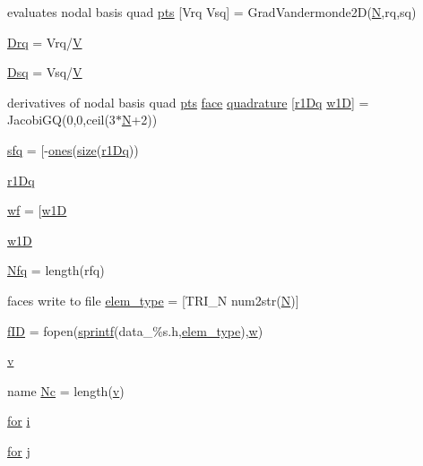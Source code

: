 \begin{DoxyCompactItemize}
evaluates nodal basis quad \hyperlink{a01014_a7d2fb616b76863109aa80a7ffdfad72b}{pts} \mbox{[}Vrq Vsq\mbox{]} = Grad\+Vandermonde2D(\hyperlink{a00473_a5b9c4563028063ee53b517cce9aa701b}{N},rq,sq)
\item 
\hyperlink{a01014_a0860e58b8f4010af9aa55717745c4b9d}{Drq} = Vrq/\hyperlink{a00575_af658e24e5ad7935911c432c5c02d895c}{V}
\item 
\hyperlink{a01014_a90f04ab0b3b4b834efda241ab283fc57}{Dsq} = Vsq/\hyperlink{a00575_af658e24e5ad7935911c432c5c02d895c}{V}
\item 
derivatives of nodal basis quad \hyperlink{a00473_a7d2fb616b76863109aa80a7ffdfad72b}{pts} \hyperlink{a00611_ac4ec0037ba529da25bf084669a45f60c}{face} \hyperlink{a01014_ac3595844f3ad3881eaa91da23069d5eb}{quadrature} \mbox{[}\hyperlink{a00473_a79d685dcbb9027705142b2a8b912aa1e}{r1\+Dq} \hyperlink{a00473_aa7de090b80d0a88d7d94e7763da3fe7e}{w1D}\mbox{]} = Jacobi\+GQ(0,0,ceil(3$\ast$\hyperlink{a00473_a5b9c4563028063ee53b517cce9aa701b}{N}+2))
\item 
\hyperlink{a01014_af5555ce3d578203ae1f6d0731e4f1170}{sfq} = \mbox{[}-\/\hyperlink{a00473_a6d4fbbd46e46569dab2b0ad8372e0220}{ones}(\hyperlink{a00611_ad6cb0afbbe6ea4f56407890be2533966}{size}(\hyperlink{a00473_a79d685dcbb9027705142b2a8b912aa1e}{r1\+Dq}))
\item 
\hyperlink{a01014_ab28e50838346fc61a7727407a03eae5b}{r1\+Dq}
\item 
\hyperlink{a01014_a7bb9d681a4df47c616b79d82759cd0e6}{wf} = \mbox{[}\hyperlink{a00473_aa7de090b80d0a88d7d94e7763da3fe7e}{w1D}
\item 
\hyperlink{a01014_aa7de090b80d0a88d7d94e7763da3fe7e}{w1D}
\item 
\hyperlink{a01014_a8e84225359762b34b0c20c9e75fc53b1}{Nfq} = length(rfq)
\item 
faces write to file \hyperlink{a01014_af732bba037e2b63deed86418a5c297fb}{elem\+\_\+type} = \mbox{[}\textquotesingle{}T\+R\+I\+\_\+N\textquotesingle{} num2str(\hyperlink{a00473_a5b9c4563028063ee53b517cce9aa701b}{N})\mbox{]}
\item 
\hyperlink{a01014_ae0527cbfd56392d5095a691bbf10ba5b}{f\+ID} = fopen(\hyperlink{a00575_ae6aab5c308faac0fc539cc9c6da9fbd0}{sprintf}(\textquotesingle{}data\+\_\+\%s.\+h\textquotesingle{},\hyperlink{a00473_a9e84386471d07238c03b10507f58eba9}{elem\+\_\+type}),\textquotesingle{}\hyperlink{a00605_aad57484016654da87125db86f4227ea3}{w}\textquotesingle{})
\item 
\hyperlink{a01014_ac4055e3a20b6b3af3d10590ea446ef6c}{v}
\item 
name \hyperlink{a01014_ae3962c98d9f11354a4d6ecf7fbd3f5b6}{Nc} = length(\hyperlink{a00605_ac4055e3a20b6b3af3d10590ea446ef6c}{v})
\item 
\hyperlink{a00623_ad1e7380d51df1e0043d24d3c8a860e0a}{for} \hyperlink{a01014_afb6aca53df96564f2adf086c942453ec}{i}
\item 
\hyperlink{a00623_ad1e7380d51df1e0043d24d3c8a860e0a}{for} \hyperlink{a01014_ac86694252f8dfdb19aaeadc4b7c342c6}{j}
\end{DoxyCompactItemize}


